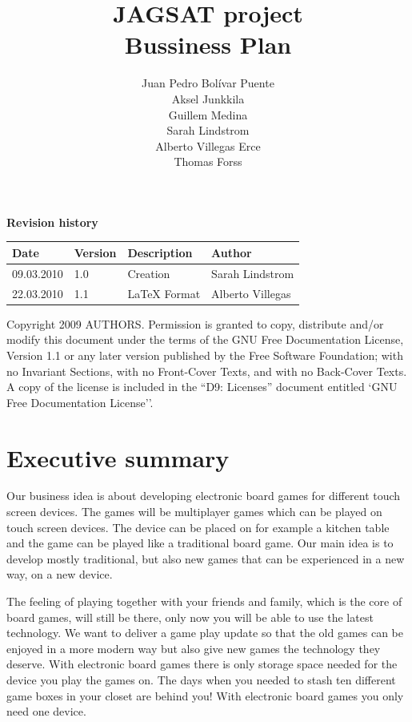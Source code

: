 \documentclass[12pt,a4paper]{article}
\title{\large JAGSAT project\\\huge Bussiness Plan}
\author{
  Juan Pedro Bolívar Puente\\ 
  Aksel Junkkila\\
  Guillem Medina\\ 
  Sarah Lindstrom\\ 
  Alberto Villegas Erce\\ 
  Thomas Forss
}
\begin{document}
\maketitle

\begin{center}
\textbf {Revision history}

\begin{tabular}{ l | l | l | l }
Date			&Version	&Description		&Author\\\hline\hline
09.03.2010	&1.0		&Creation 		&Sarah Lindstrom\\
22.03.2010	&1.1		&LaTeX Format	&Alberto Villegas
\end{tabular}
\label{tab:rev}
\end{center}

\vfill
Copyright 2009 AUTHORS.
Permission is granted to copy, distribute and/or modify this document under the terms of the GNU Free Documentation License, Version 1.1 or any later version published by the Free Software Foundation;  with no Invariant Sections, with no Front-Cover Texts, and with no Back-Cover Texts. A copy of the license is included in the ``D9: Licenses''  document entitled `GNU Free Documentation License''.

\pagebreak
\tableofcontents
\pagebreak

\section{Executive summary}
Our business idea is about developing electronic board games for different touch screen devices. The games will be multiplayer games which can be played on touch screen devices. The device can be placed on for example a kitchen table and the game can be played like a traditional board game. Our main idea is to develop mostly traditional, but also new games that can be experienced in a new way, on a new device.

The feeling of playing together with your friends and family, which is the core of board games, will still be there, only now you will be able to use the latest technology. We want to deliver a game play update so that the old games can be enjoyed in a more modern way but also give new games the technology they deserve. With electronic board games there is only storage space needed for the device you play the games on. The days when you needed to stash ten different game boxes in your closet are behind you! With electronic board games you only need one device.
\end{document}

